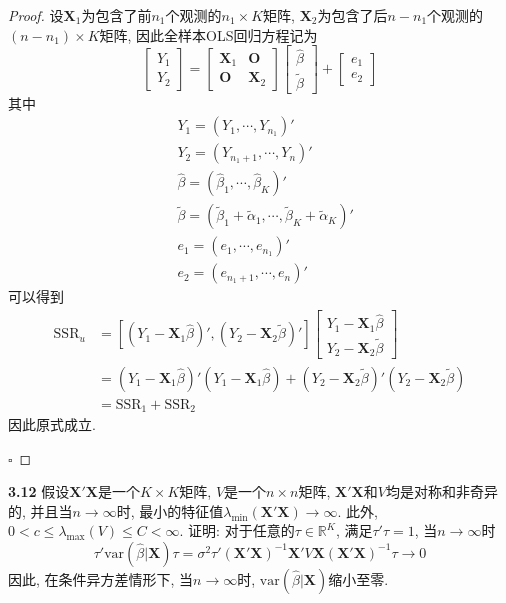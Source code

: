 \documentclass[cn,12pt,math=mtpro2,citestyle=gb7714-2015,bibstyle=gb7714-2015,twocol,mode=simple]{elegantbook}
\newcommand{\var}{\text{var}}
\newcommand{\hbeta}{\hat{\beta}}
\newcommand{\tbeta}{\tilde{\beta}}
\begin{document}
\begin{proof}
  设$\mathbf{X}_1$为包含了前$n_1$个观测的$n_1\times K$矩阵, $\mathbf{X}_2$为包含了后$n-n_1$个观测的$(n-n_1)\times K$矩阵, 因此全样本OLS回归方程记为
  $$\begin{bmatrix}
 Y_1\\
 Y_2
\end{bmatrix}=\begin{bmatrix}
 \mathbf{X}_1 & \mathbf{O}\\
 \mathbf{O} & \mathbf{X}_2
\end{bmatrix}\begin{bmatrix}
 \hbeta\\
 \tbeta
\end{bmatrix}+\begin{bmatrix}
                e_1 \\
                e_2
              \end{bmatrix}$$
其中
\begin{align*}
 &Y_1=(Y_1,\cdots,Y_{n_1})'  \\
 &Y_2=(Y_{n_1+1},\cdots,Y_n)'  \\
 &\hbeta=(\hbeta_1,\cdots,\hbeta_K)' \\
 &\tbeta=(\tbeta_1+\tilde{\alpha}_1,\cdots,\tbeta_K+\tilde{\alpha}_K)' \\
 &e_1=(e_1,\cdots,e_{n_1})' \\
 &e_2=(e_{n_1+1},\cdots,e_n)'
\end{align*}
可以得到
\begin{align*}
\text{SSR}_u&=[(Y_1-\mathbf{X}_1\hbeta)', (Y_2-\mathbf{X}_2\tbeta)']\begin{bmatrix}
                                                                                 Y_1-\mathbf{X}_1\hbeta \\
                                                                                 Y_2-\mathbf{X}_2\tbeta
                                                                                \end{bmatrix} \\
&=(Y_1-\mathbf{X}_1\hbeta)'(Y_1-\mathbf{X}_1\hbeta)+(Y_2-\mathbf{X}_2\tbeta)'(Y_2-\mathbf{X}_2\tbeta) \\
&=\text{SSR}_1+\text{SSR}_2
\end{align*}
因此原式成立.

$\square$
\end{proof}

\textbf{3.12} 假设$\mathbf{X}'\mathbf{X}$是一个$K\times K$矩阵, $V$是一个$n\times n$矩阵, $\mathbf{X}'\mathbf{X}$和$V$均是对称和非奇异的, 并且当$n \rightarrow\infty$时, 最小的特征值$\lambda_{\min}(\mathbf{X}'\mathbf{X})\rightarrow\infty$. 此外, $0<c\leq \lambda_{\max}(V)\leq C<\infty$. 证明: 对于任意的$\tau \in \mathbb{R}^K$, 满足$\tau'\tau=1$, 当$n\rightarrow\infty$时
$$\tau'\var(\hbeta|\mathbf{X})\tau=\sigma^2\tau'(\mathbf{X}'\mathbf{X})^{-1}\mathbf{X}'V\mathbf{X}(\mathbf{X}'\mathbf{X})^{-1}\tau \rightarrow 0$$
因此, 在条件异方差情形下, 当$n\rightarrow\infty$时, $\var(\hbeta|\mathbf{X})$缩小至零.
\end{document}
